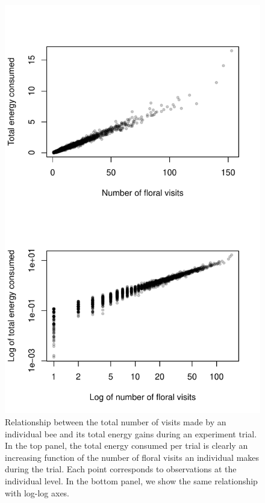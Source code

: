 \begin{refsection}
 \begin{figure}[H]
     \centerline{\includegraphics[height=0.7\textheight]{figures/appendixA_fig2.pdf}}
     \caption[Relationship between the total number of visits made by an individual bee and its total energy gains during an experiment trial.]{Relationship between the total number of visits made by an individual bee and its total energy gains during an experiment trial. In the top panel, the total energy consumed per trial is clearly an increasing function of the number of floral visits an individual makes during the trial. Each point corresponds to observations at the individual level. In the bottom panel, we show the same relationship with log-log axes. }
     \label{fig:energy_visits}
 \end{figure}{  }


\end{refsection}
